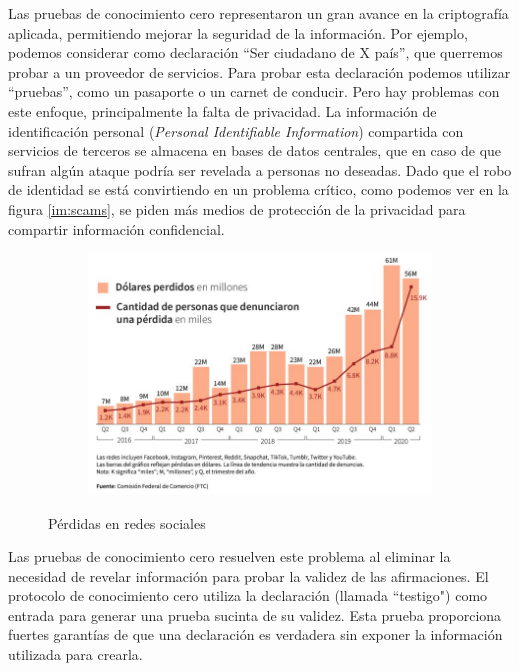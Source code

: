 Las pruebas de conocimiento cero representaron un gran avance en la criptografía aplicada, permitiendo mejorar la seguridad de la información. Por ejemplo, podemos considerar como declaración ``Ser ciudadano de X país'', que querremos probar a un proveedor de servicios. Para probar esta declaración podemos utilizar ``pruebas'', como un pasaporte o un carnet de conducir. Pero hay problemas con este enfoque, principalmente la falta de privacidad. La información de identificación personal (\emph{Personal Identifiable Information}) compartida con servicios de terceros se almacena en bases de datos centrales, que en caso de que sufran algún ataque podría ser revelada a personas no deseadas. Dado que el robo de identidad se está convirtiendo en un problema crítico, como podemos ver en la figura \autoref{im:scams}, se piden más medios de protección de la privacidad para compartir información confidencial.

\begin{figure}[ht]
    \centering
    \begin{subfigure}[c]{0.9\textwidth}
        \includegraphics[width=\textwidth]{images/scams2.jpg}
    \end{subfigure}
    \caption{Pérdidas en redes sociales \cite{Fraudes}}
    \label{im:scams}
\end{figure}

Las pruebas de conocimiento cero resuelven este problema al eliminar la necesidad de revelar información para probar la validez de las afirmaciones. El protocolo de conocimiento cero utiliza la declaración (llamada ``testigo") como entrada para generar una prueba sucinta de su validez. Esta prueba proporciona fuertes garantías de que una declaración es verdadera sin exponer la información utilizada para crearla.

